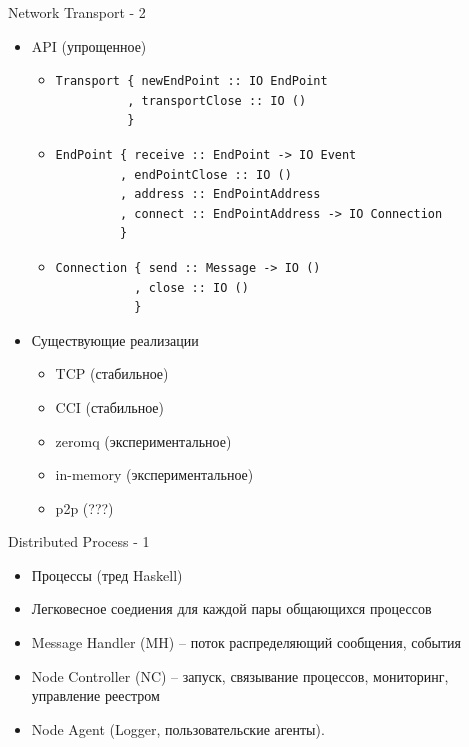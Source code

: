\documentclass{beamer}
\begin{document}
\begin{frame}[fragile]{Network Transport - 2}
  \begin{itemize}
    \item API (упрощенное)
    \begin{itemize}
      \item
\begin{verbatim}
Transport { newEndPoint :: IO EndPoint
          , transportClose :: IO ()
          }
\end{verbatim}
      \item 
\begin{verbatim}
EndPoint { receive :: EndPoint -> IO Event
         , endPointClose :: IO ()
         , address :: EndPointAddress
         , connect :: EndPointAddress -> IO Connection
         }
\end{verbatim}
      \item
\begin{verbatim}
Connection { send :: Message -> IO ()
           , close :: IO ()
           }
\end{verbatim}
    \end{itemize}
  \item Существующие реализации
    \begin{itemize}
      \item TCP (стабильное)
      \item CCI (стабильное)
      \item zeromq (экспериментальное)
      \item in-memory (экспериментальное)
      \item p2p (???)
    \end{itemize}
  \end{itemize}
\end{frame}

\begin{frame}{Distributed Process - 1}
  \begin{itemize}
    \item Процессы (тред Haskell)
    \item Легковесное соедиения для каждой пары общающихся процессов
    \item Message Handler (MH) -- поток распределяющий сообщения, события
    \item Node Controller (NC) -- запуск, связывание процессов, мониторинг, управление реестром
    \item Node Agent (Logger, пользовательские агенты).
  \end{itemize}
\end{frame}
\end{document}
